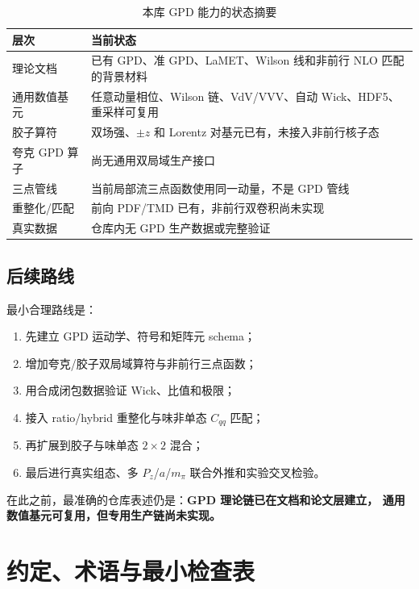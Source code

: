 \documentclass[12pt,a4paper]{ctexart}
\theoremstyle{definition}
\begin{document}
\begin{table}[H]
\centering
\small
\caption{本库 GPD 能力的状态摘要}
\label{tab:gpd-status-summary}
\begin{tabularx}{\textwidth}{p{3.8cm}X}
\toprule
层次 & 当前状态 \\
\midrule
理论文档 & 已有 GPD、准 GPD、LaMET、Wilson 线和非前行 NLO 匹配的背景材料 \\
通用数值基元 & 任意动量相位、Wilson 链、VdV/VVV、自动 Wick、HDF5、重采样可复用 \\
胶子算符 & 双场强、$\pm z$ 和 Lorentz 对基元已有，未接入非前行核子态 \\
夸克 GPD 算子 & 尚无通用双局域生产接口 \\
三点管线 & 当前局部流三点函数使用同一动量，不是 GPD 管线 \\
重整化/匹配 & 前向 PDF/TMD 已有，非前行双卷积尚未实现 \\
真实数据 & 仓库内无 GPD 生产数据或完整验证 \\
\bottomrule
\end{tabularx}
\end{table}

\subsection{后续路线}

最小合理路线是：
\begin{enumerate}[leftmargin=*]
  \item 先建立 GPD 运动学、符号和矩阵元 schema；
  \item 增加夸克/胶子双局域算符与非前行三点函数；
  \item 用合成闭包数据验证 Wick、比值和极限；
  \item 接入 ratio/hybrid 重整化与味非单态 $C_{qq}$ 匹配；
  \item 再扩展到胶子与味单态 $2\times2$ 混合；
  \item 最后进行真实组态、多 $P_z$/$a$/$m_\pi$ 联合外推和实验交叉检验。
\end{enumerate}
在此之前，最准确的仓库表述仍是：\textbf{GPD 理论链已在文档和论文层建立，
通用数值基元可复用，但专用生产链尚未实现。}

\appendix
\section{约定、术语与最小检查表}
\end{document}
